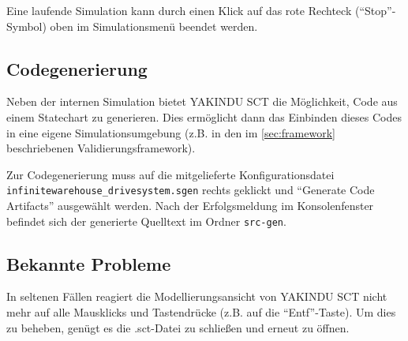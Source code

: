 Eine laufende Simulation kann durch einen Klick auf das rote Rechteck (\enquote{Stop}-Symbol) oben im Simulationsmenü beendet werden.




 



\subsection{Codegenerierung}

Neben der internen Simulation bietet YAKINDU SCT die Möglichkeit, Code aus einem State\-chart zu generieren. 
Dies ermöglicht dann das Einbinden dieses Codes in eine eigene Simulationsumgebung (z.B. in den im \autoref{sec:framework} beschriebenen Validierungsframework).

Zur Codegenerierung muss auf die mitgelieferte Konfigurationsdatei \texttt{infinitewarehouse\_drivesystem.sgen} rechts geklickt und \enquote{Generate Code Artifacts} ausgewählt werden.
Nach der Erfolgsmeldung im Konsolenfenster befindet sich der generierte Quelltext im Ordner \texttt{src-gen}. 

\enlargethispage{1\baselineskip}




 


 

\subsection{Bekannte Probleme}

In seltenen Fällen reagiert die Modellierungsansicht von YAKINDU SCT nicht mehr auf alle Mausklicks und Tastendrücke (z.B. auf die \enquote{Entf}-Taste).
Um dies zu beheben, genügt es die .sct-Datei zu schließen und erneut zu öffnen.
